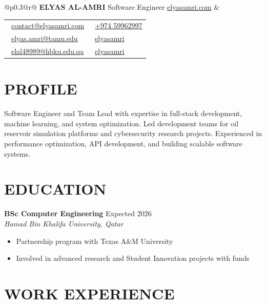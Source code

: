 \documentclass[11pt,a4paper]{article}
\begin{document}
\begin{tabular*}{\textwidth}{@{}p{}@{\extracolsep{\fill}}r@{}}
    \textbf{\Large ELYAS AL-AMRI} \newline
    Software Engineer \newline
    \href{https://elyasamri.com}{elyasamri.com} &
    \begin{tabular}[t]{@{}l@{\hspace{2em}}l@{}}
        \faEnvelope\ \href{mailto:contact@elyasamri.com}{contact@elyasamri.com} & \faPhone\ \href{tel:+97459962997}{+974 59962997} \\
        \faEnvelope\ \href{mailto:elyas.amri@tamu.edu}{elyas.amri@tamu.edu} & \faGithub\ \href{https://github.com/elyasamri}{elyasamri} \\
        \faEnvelope\ \href{mailto:elal48989@hbku.edu.qa}{elal48989@hbku.edu.qa} & \faLinkedin\ \href{https://linkedin.com/in/elyasamri}{elyasamri}
    \end{tabular}
\end{tabular*}

\vspace{10pt}

\section*{PROFILE}
Software Engineer and Team Lead with expertise in full-stack development, machine learning, and system optimization. Led development teams for oil reservoir simulation platforms and cybersecurity research projects. Experienced in performance optimization, API development, and building scalable software systems.

\section*{EDUCATION}

\textbf{BSc Computer Engineering} \hfill Expected 2026 \\
\textit{Hamad Bin Khalifa University, Qatar}
\begin{itemize}[leftmargin=2em, nosep, label={}]
    \item Partnership program with Texas A\&M University
    \item Involved in advanced research and Student Innovation projects with funds
\end{itemize}


\section*{WORK EXPERIENCE}
\end{document}
